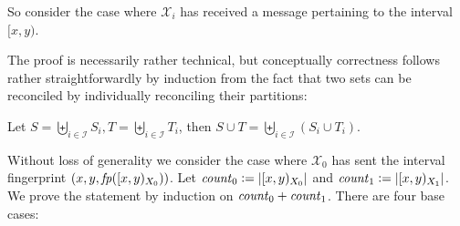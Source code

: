 So consider the case where $\mathcal{X}_i$ has received a message pertaining to the interval $[x, y)$. 







The proof is necessarily rather technical, but conceptually correctness follows rather straightforwardly by induction from the fact that two sets can be reconciled by individually reconciling their partitions:

\begin{proposition}
\label{partition-union}
Let $S = \biguplus_{i \in \mathcal{I}} S_i, T = \biguplus_{i \in \mathcal{I}} T_i$, then $S \cup T = \biguplus_{i \in \mathcal{I}} (S_i \cup T_i)$.
\end{proposition}

Without loss of generality we consider the case where $\mathcal{X}_0$ has sent the interval fingerprint $({x}, {y}, {\mathit{fp}([{x},{y})_{X_0})})$. Let $\mathit{count}_{0} \vcentcolon= |{[{x},{y})_{X_0}}|$ and $\mathit{count}_{1} \vcentcolon= |{[{x},{y})_{X_1}}|$.
We prove the statement by induction on $\mathit{count}_{0} + \mathit{count}_{1}$. There are four base cases:

